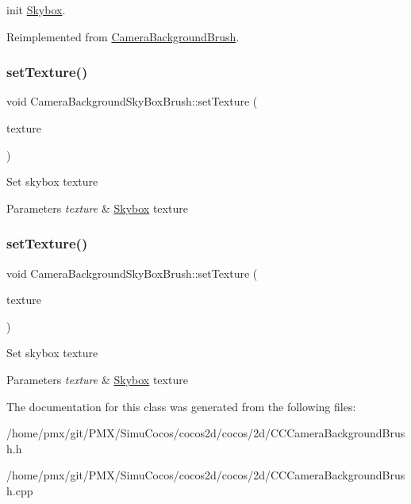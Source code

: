 init \hyperlink{classSkybox}{Skybox}. 

Reimplemented from \hyperlink{classCameraBackgroundBrush}{Camera\+Background\+Brush}.

\mbox{\label{classCameraBackgroundSkyBoxBrush_a073d2638402d47d04040b2af55d55a23}} 
\subsubsection{\texorpdfstring{set\+Texture()}{setTexture()}\hspace{0.1cm}{\footnotesize\ttfamily [1/2]}}
{\footnotesize\ttfamily void Camera\+Background\+Sky\+Box\+Brush\+::set\+Texture (\begin{DoxyParamCaption}\item[{\hyperlink{classTextureCube}{Texture\+Cube} $\ast$}]{texture }\end{DoxyParamCaption})}

Set skybox texture 
\begin{DoxyParams}{Parameters}
{\em texture} & \hyperlink{classSkybox}{Skybox} texture \\
\hline
\end{DoxyParams}
\mbox{\label{classCameraBackgroundSkyBoxBrush_a073d2638402d47d04040b2af55d55a23}} 
\subsubsection{\texorpdfstring{set\+Texture()}{setTexture()}\hspace{0.1cm}{\footnotesize\ttfamily [2/2]}}
{\footnotesize\ttfamily void Camera\+Background\+Sky\+Box\+Brush\+::set\+Texture (\begin{DoxyParamCaption}\item[{\hyperlink{classTextureCube}{Texture\+Cube} $\ast$}]{texture }\end{DoxyParamCaption})}

Set skybox texture 
\begin{DoxyParams}{Parameters}
{\em texture} & \hyperlink{classSkybox}{Skybox} texture \\
\hline
\end{DoxyParams}


The documentation for this class was generated from the following files\+:\begin{DoxyCompactItemize}
\item 
/home/pmx/git/\+P\+M\+X/\+Simu\+Cocos/cocos2d/cocos/2d/C\+C\+Camera\+Background\+Brush.\+h\item 
/home/pmx/git/\+P\+M\+X/\+Simu\+Cocos/cocos2d/cocos/2d/C\+C\+Camera\+Background\+Brush.\+cpp\end{DoxyCompactItemize}
